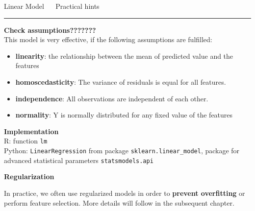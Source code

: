 \documentclass[11pt,compress,t,notes=noshow, xcolor=table]{beamer}
\begin{document}

\LARGE
\begin{frame}{\textcolor{gray!80}{Linear Model} ~~ Practical hints}
\normalsize
\vspace{-0.5cm}
\noindent \textcolor{gray!80}{\rule{\textwidth}{1pt}}

\vspace{0.3cm}

\footnotesize

 \textbf{\textcolor{gray!80}{Check assumptions???????}} \\
 This model is very effective, if the following assumptions are fulfilled:
 \begin{itemize}\footnotesize
  \item \textbf{linearity}: the relationship between the mean of predicted value and the features
  \item \textbf{homoscedasticity}: The variance of residuals is equal for all features.
  \item \textbf{independence}: All observations are independent of each other.
  \item \textbf{normality}: Y is normally distributed for any fixed value of the features
\end{itemize}

\lz

  \textbf{\textcolor{gray!80}{Implementation}} \\
  \smallskip
  R: function \texttt{lm}\\
  Python: \texttt{LinearRegression} from package \texttt{sklearn.linear\_model}, package for advanced statistical parameters \texttt{statsmodels.api} 

\lz

 \textbf{\textcolor{gray!80}{Regularization}} \\
 \smallskip
 
 In practice, we often use regularized models in order to \textbf{prevent overfitting} or perform feature selection. More details will follow in the subsequent chapter. 


\end{frame}




% 
% 
\end{document}
